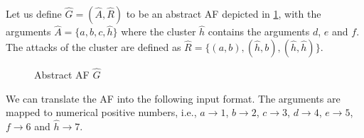 \begin{example}
    Let us define $\hat{G}=(\hat{A}, \hat{R})$ to be an abstract AF depicted in \cref{af:implementationInputExample}, with the arguments $\hat{A}=\{a, b, c, \hat{h}\}$ where the cluster $\hat{h}$ contains the arguments $d$, $e$ and $f$. The attacks of the cluster are defined as $\hat{R}=\big\{ (a, b), (\hat{h}, b), (\hat{h}, \hat{h})\big\}$.

\vspace{0.3cm}
\begin{figure}[h]
    \centering
    \caption{Abstract AF $\hat{G}$}
    \label{af:implementationInputExample}
\end{figure}

\vspace{0.3cm}
We can translate the AF into the following input format. The arguments are mapped to numerical positive numbers, i.e., $a \rightarrow 1$, $b \rightarrow 2$, $c \rightarrow 3$, $d \rightarrow 4$, $e \rightarrow 5$, $f \rightarrow 6$ and $\hat{h} \rightarrow 7$.

\vspace{0.3cm}
\begin{center}
\end{center}
\end{example}
